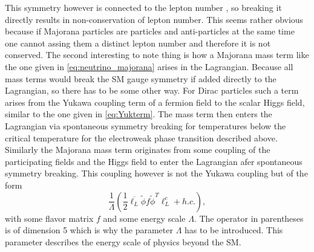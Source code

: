 This symmetry however is connected to the lepton number \cite[p. 14]{Bernreuther:2002uj}, so breaking it directly results in non-conservation of lepton number. This seems rather obvious because if Majorana particles are particles and anti-particles at the same time one cannot assing them a distinct lepton number and therefore it is not conserved. \newline \indent
The second interesting to note thing is how a Majorana mass term like the one given in \eqref{eq:neutrino_majorana} arises in the Lagrangian. Because all mass terms would break the SM gauge symmetry if added directly to the Lagrangian, so there has to be some other way. For Dirac particles such a term arises from the Yukawa coupling term of a fermion field to the scalar Higgs field, similar to the one given in \eqref{eq:Yukterm}. The mass term then enters the Lagrangian via spontaneous symmetry breaking for temperatures below the critical temperature for the electroweak phase transition described above. Similarly the Majorana mass term originates from some coupling of the participating fields and the Higgs field to enter the Lagrangian afer spontaneous symmetry breaking. This coupling however is not the Yukawa coupling but of the form \cite[Eq. (5)]{Drewes:2013gca}
\begin{equation}
	\frac{1}{\Lambda}\left(\frac{1}{2}\overline{\ell_L}\tilde{\phi}f\tilde{\phi}^T\ell^c_L+h.c.\right),
\end{equation}
with some flavor matrix $f$ and some energy scale $\Lambda$. The operator in parentheses is of dimension 5 which is why the parameter $\Lambda$ has to be introduced. This parameter describes the energy scale of physics beyond the SM.
